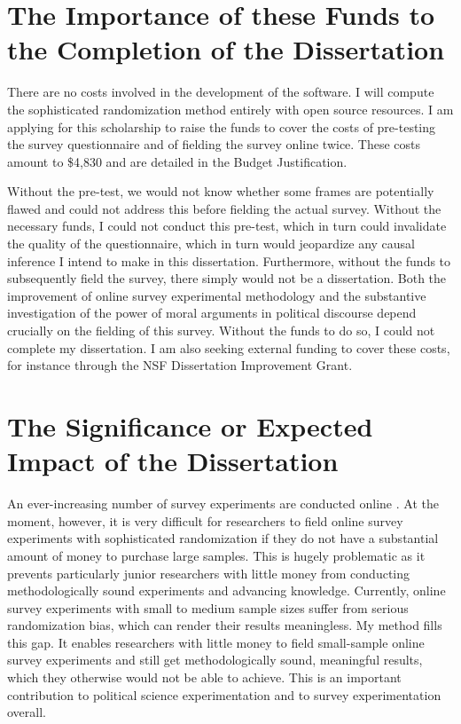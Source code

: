 \documentclass[11pt]{article}
\begin{document}
\section{The Importance of these Funds to the Completion of the Dissertation}

\vspace{0.3cm}

There are no costs involved in the development of the software. I will compute the sophisticated randomization method entirely with open source resources. I am applying for this scholarship to raise the funds to cover the costs of pre-testing the survey questionnaire and of fielding the survey online twice. These costs amount to \$4,830 and are detailed in the Budget Justification.

Without the pre-test, we would not know whether some frames are potentially flawed and could not address this before fielding the actual survey. Without the necessary funds, I could not conduct this pre-test, which in turn could invalidate the quality of the questionnaire, which in turn would jeopardize any causal inference I intend to make in this dissertation. Furthermore, without the funds to subsequently field the survey, there simply would not be a dissertation. Both the improvement of online survey experimental methodology and the substantive investigation of the power of moral arguments in political discourse depend crucially on the fielding of this survey. Without the funds to do so, I could not complete my dissertation. I am also seeking external funding to cover these costs, for instance through the NSF Dissertation Improvement Grant.

\section{The Significance or Expected Impact of the Dissertation}

\vspace{0.3cm}

An ever-increasing number of survey experiments are conducted online \citep{mutz_population-based_2011}. At the moment, however, it is very difficult for researchers to field online survey experiments with sophisticated randomization if they do not have a substantial amount of money to purchase large samples. This is hugely problematic as it prevents particularly junior researchers with little money from conducting methodologically sound experiments and advancing knowledge. Currently, online survey experiments with small to medium sample sizes suffer from serious randomization bias, which can render their results meaningless. My method fills this gap. It enables researchers with little money to field small-sample online survey experiments and still get methodologically sound, meaningful results, which they otherwise would not be able to achieve. This is an important contribution to political science experimentation and to survey experimentation overall.
\end{document}
